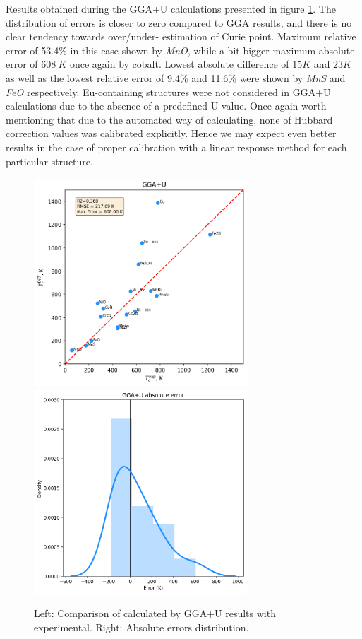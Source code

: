 Results obtained during the GGA+U calculations presented in figure \ref{fig:gga_u}.  The distribution of errors is closer to zero compared to GGA results, and there is no clear tendency towards over/under- estimation of Curie point.  Maximum relative error of 53.4\% in this case shown by \textit{MnO}, while a bit bigger maximum absolute error of $608\ K$ once again by cobalt.  Lowest absolute difference of $15K$ and $23K$ as well as the lowest relative error of 9.4\% and 11.6\% were shown by \textit{MnS} and \textit{FeO} respectively.  Eu-containing structures were not considered in GGA+U calculations due to the absence of a predefined U value. Once again worth mentioning that due to the automated way of calculating, none of Hubbard correction values was calibrated explicitly. Hence we may expect even better results in the case of proper calibration with a linear response method for each particular structure.

\begin{figure}[H]
\centering
\captionsetup{justification=centering,margin=2cm}
	\includegraphics[width=80mm]{fig/dft_fig/gga_u_results.png}\includegraphics[width=80mm]{fig/dft_fig/gga_u_err.png}
	\caption[Comparison of calculated by GGA+U results with experimental.]{Left: Comparison of calculated by GGA+U results with experimental. Right: Absolute errors distribution.}
\label{fig:gga_u}
\end{figure}


